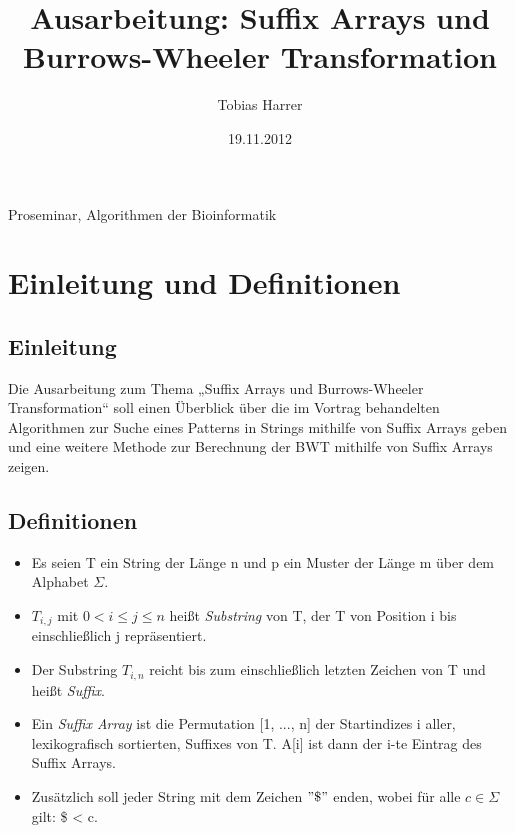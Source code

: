 \documentclass[12pt,twoside]{article}
\begin{document}
\author{Tobias Harrer}
\title{Ausarbeitung: Suffix Arrays und Burrows-Wheeler Transformation}
\date{19.11.2012}
\maketitle
Proseminar, Algorithmen der Bioinformatik
\tableofcontents	%
\newpage
\section{Einleitung und Definitionen}
\subsection{Einleitung}
Die Ausarbeitung zum Thema „Suffix Arrays und Burrows-Wheeler Transformation“ soll einen Überblick über die im Vortrag behandelten Algorithmen zur Suche eines Patterns in Strings mithilfe von Suffix Arrays geben und eine weitere Methode zur Berechnung der BWT mithilfe von Suffix Arrays zeigen.
\subsection{Definitionen}
\begin{itemize}
\item Es seien T ein String der Länge n und p ein Muster der Länge m über dem Alphabet $\Sigma$.
\item $T_{i,j}$ mit $0<i\leq j\leq n$ heißt \textit{Substring} von T, der T von Position i bis einschließlich j repräsentiert.
\item Der Substring $T_{i,n}$ reicht bis zum einschließlich letzten Zeichen von T und heißt \textit{Suffix}.
\item Ein \textit{Suffix Array} ist die Permutation [1, ..., n] der Startindizes i aller, lexikografisch sortierten, Suffixes von T. A[i] ist dann der i-te Eintrag des Suffix Arrays.
\item Zusätzlich soll jeder String mit dem Zeichen $"\$"$ enden, wobei für alle $c \in \Sigma$ gilt: \$ < c.
\end{itemize}
\end{document}
